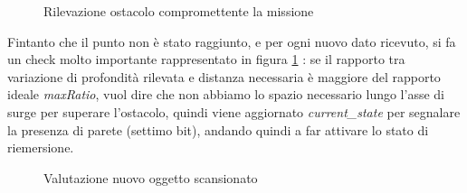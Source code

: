 \documentclass{article}
\begin{document}
            \begin{figure} [ht]
                \caption{Rilevazione ostacolo compromettente la missione}
                \label{fig:wall1}
            \end{figure}

            Fintanto che il punto non è stato raggiunto, e per ogni nuovo dato ricevuto, si fa un check molto importante rappresentato in figura \ref{fig:wall1} : se il rapporto tra variazione di 
            profondità rilevata e distanza necessaria è maggiore del rapporto ideale \emph{maxRatio}, vuol dire che non abbiamo lo spazio necessario lungo l'asse di
            surge per superare l'ostacolo, quindi viene aggiornato \emph{current\_state} per segnalare la presenza di parete (settimo bit), andando quindi a far attivare
            lo stato di riemersione. 

            
            \begin{figure} [ht]
                \caption{Valutazione nuovo oggetto scansionato}
                \label{fig:nopieno}
            \end{figure}
\end{document}
